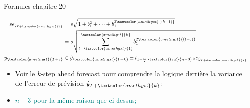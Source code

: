 \documentclass[12pt, titlepage, french]{report}
\begin{document}
\begin{FORMULA_SUMM}{Formules chapitre 20}
\setlength{\mathindent}{-1cm}
\begin{minipage}[ht]{0.5\linewidth}
\begin{align*}
	se_{\hat{y}_{T + \textcolor{amethyst}{k}}} 
		&= 	s \sqrt{1 + b_{1}^{2} + \dots + b_{1}^{2\textcolor{amethyst}{(k - 1)}}}	\\
		&=	s \sqrt{\sum_{t = \textcolor{amethyst}{1}}^{\textcolor{amethyst}{k}} b_{1}^{2\textcolor{amethyst}{(t - 1)}}}	\\
	y_{\textcolor{amethyst}{T + k}}
		&\in		\hat{y}_{\textcolor{amethyst}{T + k}} \pm	t_{1 - \frac{\alpha}{2}, \textcolor{teal}{n - 3}} \, se_{\hat{y}_{T + \textcolor{amethyst}{k}}}	
\end{align*}
\end{minipage}
\begin{minipage}[ht]{0.5\linewidth}
\begin{itemize}
	\item	\textcolor{amethyst}{Voir le $k$-step ahead forecast pour comprendre la logique derrière la variance de l'erreur de prévision $\hat{y}_{T + \textcolor{amethyst}{k}}$;}
	\item	\textcolor{teal}{$n - 3$ pour la même raison que ci-dessus;}
\end{itemize}
\end{minipage}
\setlength{\mathindent}{1cm}
\end{FORMULA_SUMM}
\end{document}
